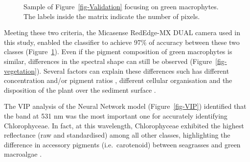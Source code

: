 \documentclass[
  number]{elsarticle}
\begin{document}
\label{cell-fig-ValidationGreen}
\begin{figure}[H]


\caption{\label{fig-ValidationGreen}Sample of
Figure~\ref{fig-Validation} focusing on green macrophytes. The labels
inside the matrix indicate the number of pixels.}

\end{figure}%

Meeting these two criteria, the Micasense RedEdge-MX DUAL camera used in
this study, enabled the classifier to achieve 97\% of accuracy between
these two classes (Figure~\ref{fig-ValidationGreen}). Even if the
pigment composition of green macrophytes is similar, differences in the
spectral shape can still be observed (Figure~\ref{fig-vegetation}).
Several factors can explain these differences such has different
concentration and/or pigment ratios \citep{bargain2013seasonal},
different cellular organisation and the disposition of the plant over
the sediment surface \citetext{\citealp[ ]{beach1997vivo}; \citealp[
]{kirk1994light}; \citealp{hedley2018influence}}.

The VIP analysis of the Neural Network model (Figure~\ref{fig-VIP})
identified that the band at 531 nm was the most important one for
accurately identifying Chlorophyceae. In fact, at this wavelength,
Chlorophyceae exhibited the highest reflectance (raw and standardised)
among all other classes, highlighting the difference in accessory
pigments (i.e.~carotenoid) between seagrasses and green macroalgae
\citep{repolho2017seagrass}.
\end{document}

